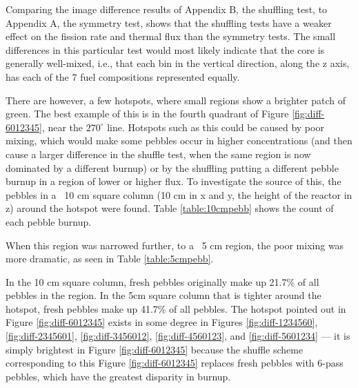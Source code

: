 Comparing the image difference results of Appendix B, the shuffling test, to Appendix A, the symmetry test, shows that the shuffling tests have a weaker effect on the fission rate and thermal flux than the symmetry tests.  The small differences in this particular test would most likely indicate that the core is generally well-mixed, i.e., that each bin in the vertical direction, along the z axis, has each of the 7 fuel compositions represented equally.

There are however, a few hotspots, where small regions show a brighter patch of green.  The best example of this is in the fourth quadrant of Figure \ref{fig:diff-6012345}, near the $270^{\circ}$ line.  Hotspots such as this could be caused by poor mixing, which would make some pebbles occur in higher concentrations (and then cause a larger difference in the shuffle test, when the same region is now dominated by a different burnup) or by the shuffling putting a different pebble burnup in a region of lower or higher flux.  To investigate the source of this, the pebbles in a ~10 cm square column (10 cm in x and y, the height of the reactor in z) around the hotspot were found.  Table \ref{table:10cmpebb} shows the count of each pebble burnup.



When this region was narrowed further, to a ~5 cm region, the poor mixing was more dramatic, as seen in Table \ref{table:5cmpebb}.



In the 10 cm square column, fresh pebbles originally make up 21.7\% of all pebbles in the region.  In the 5cm square column that is tighter around the hotspot, fresh pebbles make up 41.7\% of all pebbles.  The hotspot pointed out in Figure \ref{fig:diff-6012345} exists in some degree in Figures \ref{fig:diff-1234560}, \ref{fig:diff-2345601}, \ref{fig:diff-3456012}, \ref{fig:diff-4560123}, and \ref{fig:diff-5601234} --- it is simply brightest in Figure \ref{fig:diff-6012345} because the shuffle scheme corresponding to this Figure \ref{fig:diff-6012345} replaces fresh pebbles with 6-pass pebbles, which have the greatest disparity in burnup.